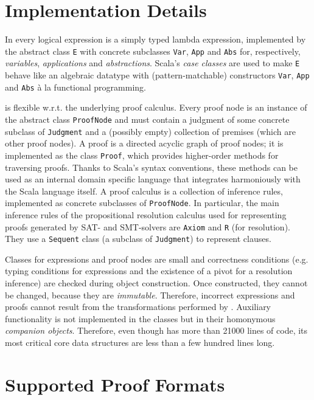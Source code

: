 \documentclass{llncs}
\newcommand{\class}[1]{\texttt{#1}}
\begin{document}
\section{Implementation Details}

In {\skeptik} every logical expression is a simply typed lambda expression, implemented by the abstract class \class{E} with concrete subclasses \class{Var}, \class{App} and \class{Abs} for, respectively, \emph{variables}, \emph{applications} and \emph{abstractions}. Scala's \emph{case classes} are used to make \class{E} behave like an algebraic datatype with (pattern-matchable) constructors \class{Var}, \class{App} and \class{Abs} \`{a} la functional programming.

{\skeptik} is flexible w.r.t. the underlying proof calculus. Every proof node is an instance of the abstract class \class{ProofNode} and must contain a judgment of some concrete subclass of \class{Judgment} and a (possibly empty) collection of premises (which are other proof nodes). A proof is a directed acyclic graph of proof nodes; it is implemented as the class \class{Proof}, which provides higher-order methods for traversing proofs. Thanks to Scala's syntax conventions, these methods can be used as an internal domain specific language that integrates harmoniously with the Scala language itself.
%
A proof calculus is a collection of inference rules, implemented as concrete subclasses of \class{ProofNode}. In particular, the main inference rules of the propositional resolution calculus used for representing proofs generated by SAT- and SMT-solvers are \class{Axiom} and \class{R} (for resolution). They use a \class{Sequent} class (a subclass of \class{Judgment}) to represent clauses.

Classes for expressions and proof nodes are small and correctness conditions (e.g. typing conditions for expressions and the existence of a pivot for a resolution inference) are checked during object construction. Once constructed, they cannot be changed, because they are \emph{immutable}. Therefore, incorrect expressions and proofs cannot result from the transformations performed by {\skeptik}. Auxiliary functionality is not implemented in the classes but in their homonymous \emph{companion objects}. Therefore, even though {\skeptik} has more than 21000 lines of code, its most critical core data structures are less than a few hundred lines long.

\vspace{-1pt}

\section{Supported Proof Formats}
\label{sec:ProofFormats}
\end{document}
